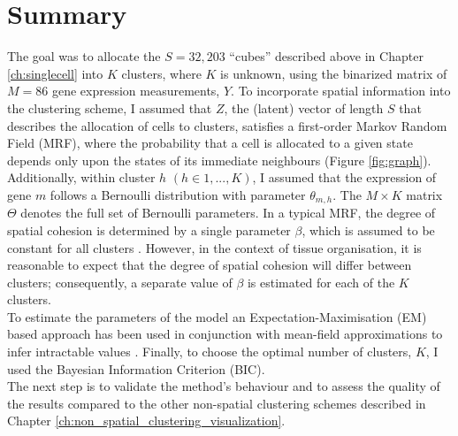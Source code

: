 \section{Summary}
The goal was to allocate the $S=32,203$ ``cubes'' described above in Chapter \ref{ch:singlecell} into $K$ clusters, where $K$ is unknown, using the binarized matrix of $M=86$ gene expression measurements, $Y$. To incorporate spatial information into the clustering scheme, I assumed that $Z$, the (latent) vector of length $S$ that describes the allocation of cells to clusters, satisfies a first-order Markov Random Field (MRF), where the probability that a cell is allocated to a given state depends only upon the states of its immediate neighbours (Figure \ref{fig:graph}). Additionally, within cluster $h$ $(h \in {1,...,K})$, I assumed that the expression of gene $m$ follows a Bernoulli distribution with parameter $\theta_{m,h}$. The $M \times K$ matrix  $\Theta$ denotes the full set of Bernoulli parameters. In a typical MRF, the degree of spatial cohesion is determined by a single parameter $\beta$, which is assumed to be constant for all clusters \cite{subudhi14,zhang14}. However, in the context of tissue organisation, it is reasonable to expect that the degree of spatial cohesion will differ between clusters; consequently,  a separate value of $\beta$ is estimated for each of the $K$ clusters.\\

To estimate the parameters of the model an Expectation-Maximisation (EM) based approach has been used in conjunction with mean-field approximations to infer intractable values \cite{Celeux01}. Finally, to choose the optimal number of clusters, $K$, I used the Bayesian Information Criterion (BIC).\\

The next step is to validate the method's behaviour and to assess the quality of the results compared to the other non-spatial clustering schemes described in Chapter \ref{ch:non_spatial_clustering_visualization}.

